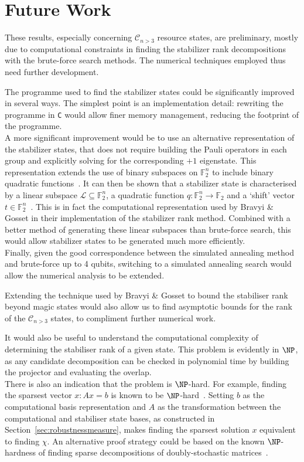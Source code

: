 \documentclass{standalone}
\begin{document}
\section*{Future Work}
These results, especially concerning $\mathcal{C}_{n>3}$ resource states, are preliminary, mostly due to computational constraints in finding the stabilizer rank decompositions with the brute-force search methods. The numerical techniques employed thus need further development. 
\par
The programme used to find the stabilizer states could be significantly improved in several ways. The simplest point is an implementation detail: rewriting the programme in \texttt{C} would allow finer memory management, reducing the footprint of the programme. \\
A more significant improvement would be to use an alternative representation of the stabilizer states, that does not require building the Pauli operators in each group and explicitly solving for the corresponding $+1$ eigenstate. This representation extends the use of binary subspaces on $\mathbb{F}_{2}^{n}$ to include binary quadratic functions~\cite{Dehaene2003}. It can then be shown that a stabilizer state is characterised by a linear subspace $\mathcal{L}\subseteq \mathbb{F}_{2}^{n}$, a quadratic function $q:\mathbb{F}_{2}^{n}\rightarrow\mathbb{F}_{2}$ and a `shift' vector $t\in\mathbb{F}_{2}^{n}$~\cite{Dehaene2003,Gross2007}. This is in fact the computational representation used by Bravyi \& Gosset in their implementation of the stabilizer rank method. Combined with a better method of generating these linear subspaces than brute-force search, this would allow stabilizer states to be generated much more efficiently. \\
Finally, given the good correspondence between the simulated annealing method and brute-force up to 4 qubits, switching to a simulated annealing search would allow the numerical analysis to be extended. 
\par
Extending the technique used by Bravyi \& Gosset to bound the stabiliser rank beyond magic states would also allow us to find asymptotic bounds for the rank of the $\mathcal{C}_{n>3}$ states, to compliment further numerical work. 
\par
It would also be useful to understand the computational complexity of determining the stabiliser rank of a given state. This problem is evidently in $\NP$, as any candidate decomposition can be checked in polynomial time by building the projector and evaluating the overlap. \\
There is also an indication that the problem is $\NP$-hard. For example, finding the sparsest vector $x:Ax=b$ is known to be $\NP$-hard~\cite{ge2011note}. Setting $b$ as the computational basis representation and $A$ as the transformation between the computational and stabiliser state bases, as constructed in Section~\ref{sec:robustnessmeasure}, makes finding the sparsest solution $x$ equivalent to finding $\chi$. An alternative proof strategy could be based on the known $\NP$-hardness of finding sparse decompositions of doubly-stochastic matrices~\cite{Dufosse2016}.
\par
\end{document}

